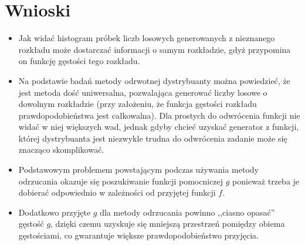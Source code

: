 \documentclass[12pt,a4paper]{article}
\begin{document}
\section{Wnioski}
\begin{itemize}
\item Jak widać histogram próbek liczb losowych generowanych z nieznanego rozkładu może dostarczać informacji o samym rozkładzie, gdyż przypomina on funkcję gęstości tego rozkładu.
\item Na podstawie badań metody odrwotnej dystrybuanty można powiedzieć, że jest metoda dość uniwersalna, pozwalająca generować liczby losowe o dowolnym rozkładzie (przy założeniu, że funkcja gęstości rozkładu prawdopodobieństwa jest całkowalna).
Dla prostych do odwrócenia funkcji nie widać w niej większych wad, jednak gdyby chcieć uzyskać generator z funkcji, której dystrybuanta jest niezwykle trudna do odwrócenia zadanie może się znacząco skomplikować.
\item Podstawowym problemem powstającym podczas używania metody odrzucania okazuje się poszukiwanie funkcji pomocniczej $g$ ponieważ trzeba je dobierać odpowiednio w zależności od przyjętej funkcji $f$.
\item Dodatkowo przyjęte $g$ dla metody odrzucania powinno ,,ciasno opasać'' gęstość $g$, dzięki czemu uzyskuje się mniejszą przestrzeń pomiędzy obiema gęstościami, co gwarantuje większe prawdopodobieństwo przyjęcia.
\end{itemize}

\nocite{rachunek2006jakubowski}
\nocite{mzykGeneracja}
\nocite{rejectionMethodSigman}
 


\end{document}
